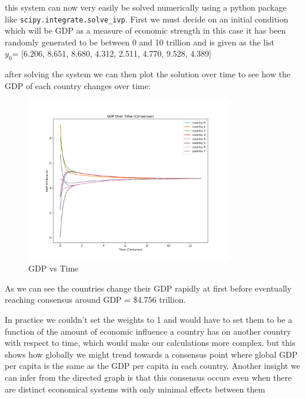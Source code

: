 \documentclass{article}
\begin{document}
\newpage

this system can now very easily be solved numerically using a python package like \lstinline|scipy.integrate.solve_ivp|. First we must decide on an initial condition which will be GDP as a measure of economic strength in this case it has been randomly generated to be between 0 and 10 trillion and is given as the list 
\\$y_0$= [6.206, 8.651, 8.680, 4.312, 2.511, 4.770, 9.528, 4.389]

after solving the system we can then plot the solution over time to see how the GDP of each country changes over time:
\begin{figure}[htbp]
    \centering
    \includegraphics[width=0.8\textwidth]{consensus.png}
    \caption{GDP vs Time}
    \label{fig: consensus.png}
\end{figure}
\FloatBarrier
\noindent
As we can see the countries change their GDP rapidly at first before eventually reaching consensus around GDP = \$4.756 trillion.

In practice we couldn't set the weights to 1 and would have to set them to be a function of the amount of economic influence a country has on another country with respect to time, which would make our calculations more complex. but this shows how globally we might trend towards a consensus point where global GDP per capita is the same as the GDP per capita in each country. Another insight we can infer from the directed graph is that this consensus occurs even when there are distinct economical systems with only minimal effects between them
\end{document}
